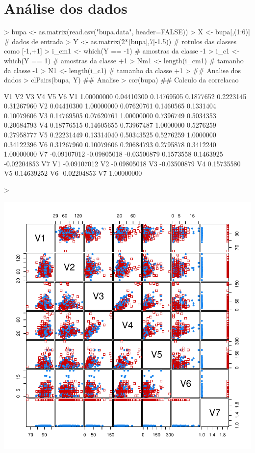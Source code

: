 \documentclass{article}
\begin{document}
\section{Análise dos dados}
\begin{Schunk}
\begin{Sinput}
> bupa <- as.matrix(read.csv("bupa.data", header=FALSE))
> X <- bupa[,(1:6)] # dados de entrada
> Y <- as.matrix(2*(bupa[,7]-1.5)) # rotulos das classes como [-1,+1]
> i_cm1 <- which(Y == -1) # amostras da classe -1
> i_c1 <- which(Y == 1) # amostras da classe +1
> Nm1 <- length(i_cm1) # tamanho da classe -1
> N1 <- length(i_c1) # tamanho da classe +1
> ## Analise dos dados
> clPairs(bupa, Y) ## Analise 
> cor(bupa) ## Calculo da correlacao
\end{Sinput}
\begin{Soutput}
            V1          V2          V3        V4        V5          V6
V1  1.00000000  0.04410300  0.14769505 0.1877652 0.2223145  0.31267960
V2  0.04410300  1.00000000  0.07620761 0.1460565 0.1331404  0.10079606
V3  0.14769505  0.07620761  1.00000000 0.7396749 0.5034353  0.20684793
V4  0.18776515  0.14605655  0.73967487 1.0000000 0.5276259  0.27958777
V5  0.22231449  0.13314040  0.50343525 0.5276259 1.0000000  0.34122396
V6  0.31267960  0.10079606  0.20684793 0.2795878 0.3412240  1.00000000
V7 -0.09107012 -0.09805018 -0.03500879 0.1573558 0.1463925 -0.02204853
            V7
V1 -0.09107012
V2 -0.09805018
V3 -0.03500879
V4  0.15735580
V5  0.14639252
V6 -0.02204853
V7  1.00000000
\end{Soutput}
\begin{Sinput}
> 
\end{Sinput}
\end{Schunk}
\includegraphics{prova-002}
\end{document}
